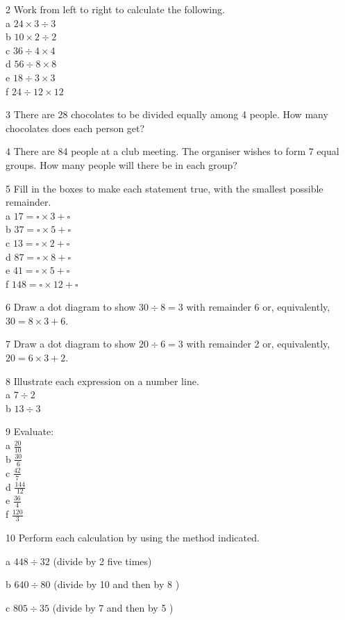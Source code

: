 \documentclass[10pt]{article}
\begin{document}
2 Work from left to right to calculate the following.\\
a \(24 \times 3 \div 3\)\\
b \(10 \times 2 \div 2\)\\
c \(36 \div 4 \times 4\)\\
d \(56 \div 8 \times 8\)\\
e \(18 \div 3 \times 3\)\\
f \(24 \div 12 \times 12\)

3 There are 28 chocolates to be divided equally among 4 people. How many chocolates does each person get?

4 There are 84 people at a club meeting. The organiser wishes to form 7 equal groups. How many people will there be in each group?

5 Fill in the boxes to make each statement true, with the smallest possible remainder.\\
a \(17=\square \times 3+\square\)\\
b \(37=\square \times 5+\square\)\\
c \(13=\square \times 2+\square\)\\
d \(87=\square \times 8+\square\)\\
e \(41=\square \times 5+\square\)\\
f \(148=\square \times 12+\square\)

6 Draw a dot diagram to show \(30 \div 8=3\) with remainder 6 or, equivalently, \(30=8 \times 3+6\).

7 Draw a dot diagram to show \(20 \div 6=3\) with remainder 2 or, equivalently, \(20=6 \times 3+2\).

8 Illustrate each expression on a number line.\\
a \(7 \div 2\)\\
b \(13 \div 3\)

9 Evaluate:\\
a \(\frac{20}{10}\)\\
b \(\frac{30}{6}\)\\
c \(\frac{42}{7}\)\\
d \(\frac{144}{12}\)\\
e \(\frac{36}{4}\)\\
f \(\frac{120}{3}\)

10 Perform each calculation by using the method indicated.

a \(448 \div 32\) (divide by 2 five times)

b \(640 \div 80\) (divide by 10 and then by 8 )

c \(805 \div 35\) (divide by 7 and then by 5 )
\end{document}
